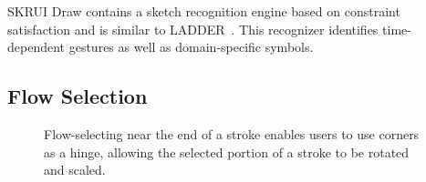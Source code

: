 \documentclass{egpubl}
\begin{document}
SKRUI Draw contains a sketch recognition engine based on constraint
satisfaction and is similar to LADDER~\cite{hammond-ladder}. This
recognizer identifies time-dependent gestures as well as
domain-specific symbols.

\subsection{Flow Selection}

\begin{figure}
  \centering {}
\hspace{0.4cm} 
  \caption{Flow-selecting near the end of a stroke enables users to
    use corners as a hinge, allowing the selected portion of a stroke
    to be rotated and scaled.}
  \label{fig:fs-hinge}
\end{figure}

\end{document}
